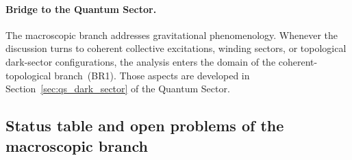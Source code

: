 \documentclass[11pt,a4paper]{article}
\numberwithin{equation}{section}
\begin{document}




\paragraph{Bridge to the Quantum Sector.}
The macroscopic branch addresses gravitational phenomenology. Whenever
the discussion turns to coherent collective excitations, winding sectors,
or topological dark-sector configurations, the analysis enters the domain
of the coherent-topological branch~(BR1). Those aspects are developed in
Section~\ref{sec:qs_dark_sector} of the Quantum Sector.

\subsection{Status table and open problems of the
macroscopic branch}
\label{sec:mp_status}
\end{document}
